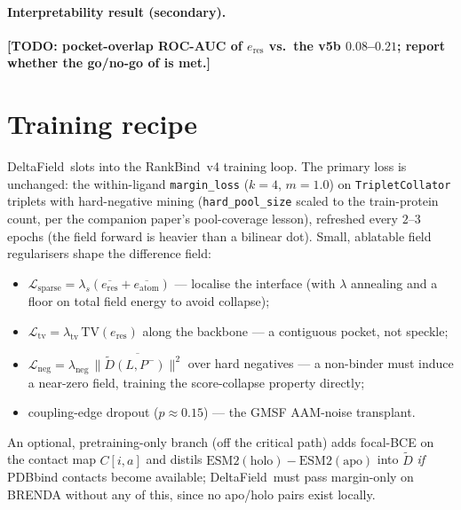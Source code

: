 \documentclass[11pt,a4paper]{article}
\newcommand{\df}{DeltaField\xspace}
\newcommand{\method}{RankBind\xspace}
\newcommand{\TODO}[1]{\textcolor{red!80!black}{\textbf{[TODO: #1]}}}
\begin{document}
\paragraph{Interpretability result (secondary).}
\TODO{pocket-overlap ROC-AUC of $e_{\text{res}}$ vs.\ the v5b $0.08$--$0.21$;
report whether the go/no-go of \Cref{sec:dual} is met.}

\section{Training recipe}
\label{sec:recipe}

\df\ slots into the \method\ v4 training loop. The primary loss is unchanged:
the within-ligand \texttt{margin\_loss} ($k=4$, $m=1.0$) on
\texttt{TripletCollator} triplets with hard-negative mining
(\texttt{hard\_pool\_size} scaled to the train-protein count, per the
companion paper's pool-coverage lesson), refreshed every $2$--$3$ epochs (the
field forward is heavier than a bilinear dot). Small, ablatable field
regularisers shape the difference field:
\begin{itemize}[leftmargin=*,itemsep=0pt,topsep=2pt]
  \item $\mathcal{L}_{\text{sparse}}=\lambda_s(\overline{e_{\text{res}}}+\overline{e_{\text{atom}}})$
        --- localise the interface (with $\lambda$ annealing and a floor on
        total field energy to avoid collapse);
  \item $\mathcal{L}_{\text{tv}}=\lambda_{\text{tv}}\,\mathrm{TV}(e_{\text{res}})$
        along the backbone --- a contiguous pocket, not speckle;
  \item $\mathcal{L}_{\text{neg}}=\lambda_{\text{neg}}\,
        \overline{\lVert\tilde{D}(L,P^-)\rVert^2}$ over hard negatives --- a
        non-binder must induce a near-zero field, training the score-collapse
        property directly;
  \item coupling-edge dropout ($p\approx0.15$) --- the GMSF AAM-noise
        transplant.
\end{itemize}
An optional, pretraining-only branch (off the critical path) adds focal-BCE on
the contact map $C[i,a]$ and distils $\mathrm{ESM2}(\text{holo})-
\mathrm{ESM2}(\text{apo})$ into $\tilde{D}$ \emph{if} PDBbind contacts become
available; \df\ must pass margin-only on BRENDA without any of this, since no
apo/holo pairs exist locally.

\end{document}

